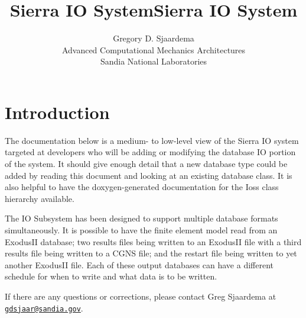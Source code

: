 \documentclass[11pt,twoside]{article}
\title{Sierra IO System}
\begin{document}
\clearpage\pagestyle{Standard}
\title{Sierra IO System}
\author{Gregory D. Sjaardema\\
	Advanced Computational Mechanics Architectures\\
	Sandia National Laboratories}

\maketitle

\setcounter{tocdepth}{3}
\setlength{\parskip}{0ex plus 0.5ex minus 0.2ex}
\tableofcontents

\section{Introduction}
The documentation below is a medium{}- to low{}-level view of the Sierra
IO system targeted at developers who will be adding or modifying the
database IO portion of the system. It should give enough detail that a
new database type could be added by reading this document and looking
at an existing database class. It is also helpful to have the
doxygen{}-generated documentation for the Ioss class hierarchy
available.

The IO Subsystem has been designed to support multiple database formats
simultaneously. It is possible to have the finite element model read
from an ExodusII database; two results files being written to an
ExodusII file with a third results file being written to a CGNS file;
and the restart file being written to yet another ExodusII file. Each of
these output databases can have a different schedule for when to write
and what data is to be written.

If there are any questions or corrections, please contact Greg Sjaardema
at \href{mailto:gdsjaar@sandia.gov}{\nolinkurl{gdsjaar@sandia.gov}}.

\setlength{\parskip}{1ex plus 0.5ex minus 0.2ex}
\end{document}
